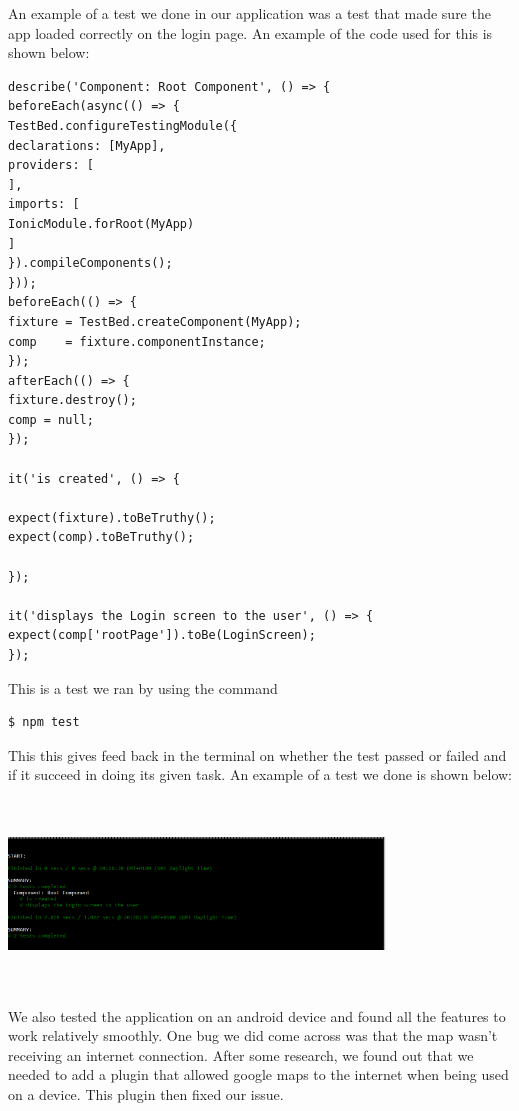 An example of a test we done in our application was a test that made sure the app loaded correctly on the login page. An example of the code used for this is shown below: 

 \begin{verbatim}
describe('Component: Root Component', () => {
beforeEach(async(() => {
TestBed.configureTestingModule({
declarations: [MyApp],
providers: [
],
imports: [
IonicModule.forRoot(MyApp)
]
}).compileComponents();
}));
beforeEach(() => {
fixture = TestBed.createComponent(MyApp);
comp    = fixture.componentInstance;
});
afterEach(() => {
fixture.destroy();
comp = null;
});

it('is created', () => {

expect(fixture).toBeTruthy();
expect(comp).toBeTruthy();

});

it('displays the Login screen to the user', () => {
expect(comp['rootPage']).toBe(LoginScreen);
});

\end{verbatim}

This is a test we ran by using the command 

\begin{verbatim}
$ npm test
\end{verbatim}

This this gives feed back in the terminal on whether the test passed or failed and if it succeed in doing its given task. An example of a test we done is shown below:

\begin{center}    
	\includegraphics[width=10cm, height=5cm]{img/logintest.png}
\end{center}

We also tested the application on an android device and found all the features to work relatively smoothly. One bug we did come across was that the map wasn't receiving an internet connection. After some research, we found out that we needed to add a plugin that allowed google maps to the internet when being used on a device. This plugin then fixed our issue.\cite{cordovapluginnetwork}


